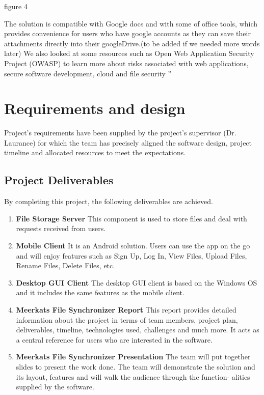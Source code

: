 \documentclass{article}
\begin{document}
figure 4

The solution is compatible with Google docs and with some of office tools, which provides convenience for users who have google accounts as they can save their attachments directly into their googleDrive.(to be added if we needed more words later)
\newline
\hfill \break
We also looked at some resources such as Open Web Application Security Project (OWASP) to learn more about risks associated with web applications, secure software development, cloud and file security ''


\section{Requirements and design}
Project’s requirements have been supplied by the project’s supervisor (Dr. Laurance) for which the team has precisely aligned the software design, project timeline and allocated resources to meet the expectations.

\subsection{Project Deliverables}
By completing this project, the following deliverables are achieved.
\begin{enumerate}
  \item \textbf{File Storage Server} This component is used to store files and deal with requests received from users.
  \item \textbf{Mobile Client} It is an Android solution. Users can use the app on the go and will enjoy features such as Sign Up, Log In, View Files, Upload Files, Rename Files, Delete Files, etc.
  \item \textbf{Desktop GUI Client} The desktop GUI client is based on the Windows OS and it includes the same features as the mobile client.
  \item \textbf{Meerkats File Synchronizer Report} This report provides detailed information about the project in terms of team members, project plan, deliverables, timeline, technologies used, challenges and much more. It acts as a central reference for users who are interested in the software.
  \item \textbf{Meerkats File Synchronizer Presentation} The team will put together slides to present the work done. The team will demonstrate the solution and its layout, features and will walk the audience through the function- alities supplied by the software.
\end{enumerate}
\end{document}
